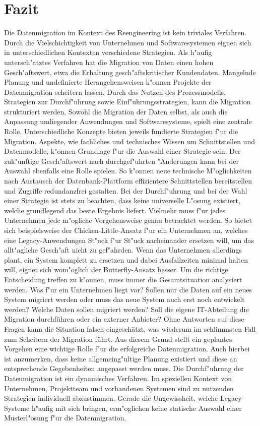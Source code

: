 \section{Fazit}
\label{chapter:fazit}

Die Datenmigration im Kontext des Reengineering ist kein triviales Verfahren. Durch die Vielschichtigkeit von Unternehmen und Softwaresystemen eignen sich in unterschiedlichen Kontexten verschiedene Strategien. Als h"aufig untersch"atztes Verfahren hat die Migration von Daten einen hohen Gesch"aftswert, etwa die Erhaltung gesch"aftskritischer Kundendaten. Mangelnde Planung und undefinierte Herangehensweisen k"onnen Projekte der Datenmigration scheitern lassen. Durch das Nutzen des Prozessmodells, Strategien zur Durchf"uhrung sowie Einf"uhrungsstrategien, kann die Migration strukturiert werden.
\lb
Sowohl die Migration der Daten selbst, als auch die Anpassung umliegender Anwendungen und Softwaresysteme, spielt eine zentrale Rolle. Unterschiedliche Konzepte bieten jeweils fundierte Strategien f"ur die Migration. Aspekte, wie fachliches und technisches Wissen um Schnittstellen und Datenmodelle, k"onnen Grundlage f"ur die Auswahl einer Strategie sein. Der zuk"unftige Gesch"aftswert nach durchgef"uhrten "Anderungen kann bei der Auswahl ebenfalls eine Rolle spielen. So k"onnen neue technische M"oglichkeiten nach Austausch der Datenbank-Plattform effizientere Schnittstellen bereitstellen und Zugriffe redundanzfrei gestalten.
\lb
Bei der Durchf"uhrung und bei der Wahl einer Strategie ist stets zu beachten, dass keine universelle L"osung existiert, welche grundlegend das beste Ergebnis liefert. Vielmehr muss f"ur jedes Unternehmen jede m"ogliche Vorgehensweise genau betrachtet werden. So bietet sich beispielsweise der Chicken-Little-Ansatz f"ur ein Unternehmen an, welches eine Legacy-Anwendungen St"uck f"ur St"uck nacheinander ersetzen will, um das allt"agliche Gesch"aft nicht zu gef"ahrden. Wenn das Unternehmen allerdings plant, ein System komplett zu ersetzen und dabei Ausfallzeiten minimal halten will, eignet sich wom"oglich der Butterfly-Ansatz besser.
\lb
Um die richtige Entscheidung treffen zu k"onnen, muss immer die Gesamtsituation analysiert werden. Was f"ur ein Unternehmen liegt vor? Sollen nur die Daten auf ein neues System migriert werden oder muss das neue System auch erst noch entwickelt werden? Welche Daten sollen migriert werden? Soll die eigene IT-Abteilung die Migration durchführen oder ein externer Anbieter? Ohne Antworten auf diese Fragen kann die Situation falsch eingeschätzt, was wiederum im schlimmsten Fall zum Scheitern der Migration führt. Aus diesem Grund stellt ein geplantes Vorgehen eine wichtige Rolle f"ur die erfolgreiche Datenmigration. Auch hierbei ist anzumerken, dass keine allgemeing"ultige Planung existiert und diese an entsprechende Gegebenheiten angepasst werden muss. 
\lb
Die Durchf"uhrung der Datenmigration ist ein dynamisches Verfahren. Im speziellen Kontext von Unternehmen, Projektteam und vorhandenen Systemen sind zu nutzenden Strategien individuell abzustimmen. Gerade die Ungewissheit, welche Legacy-Systeme h"aufig mit sich bringen, erm"oglichen keine statische Auswahl einer Musterl"osung f"ur die Datenmigration.